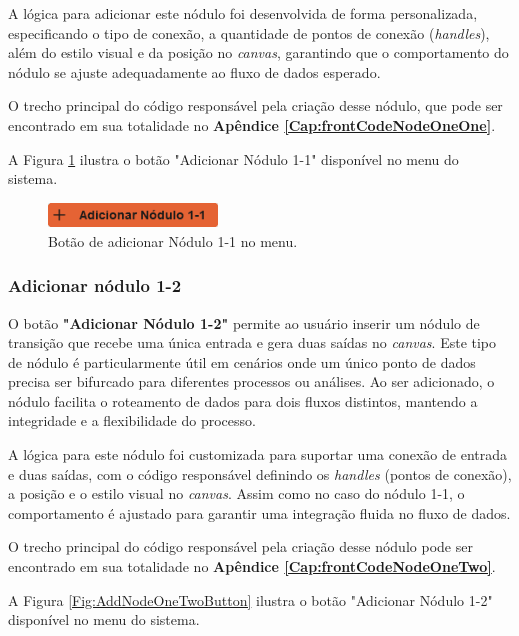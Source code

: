 A lógica para adicionar este nódulo foi desenvolvida de forma personalizada, especificando o tipo de conexão, a quantidade de pontos de conexão (\textit{handles}), além do estilo visual e da posição no \textit{canvas}, garantindo que o comportamento do nódulo se ajuste adequadamente ao fluxo de dados esperado.

O trecho principal do código responsável pela criação desse nódulo, que pode ser encontrado em sua totalidade no \textbf{Apêndice \ref{Cap:frontCodeNodeOneOne}}.

A Figura \ref{Fig:AddNodeOneOneButton} ilustra o botão "Adicionar Nódulo 1-1" disponível no menu do sistema.

\begin{figure}[htbp]
    \centering
    \includegraphics[width=0.4\textwidth]{figuras/add-node11-button.png}
    \caption{Botão de adicionar Nódulo 1-1 no menu.}
    \label{Fig:AddNodeOneOneButton}
\end{figure}


\subsubsection{Adicionar nódulo 1-2}

O botão \textbf{"Adicionar Nódulo 1-2"} permite ao usuário inserir um nódulo de transição que recebe uma única entrada e gera duas saídas no \textit{canvas}. Este tipo de nódulo é particularmente útil em cenários onde um único ponto de dados precisa ser bifurcado para diferentes processos ou análises. Ao ser adicionado, o nódulo facilita o roteamento de dados para dois fluxos distintos, mantendo a integridade e a flexibilidade do processo.

A lógica para este nódulo foi customizada para suportar uma conexão de entrada e duas saídas, com o código responsável definindo os \textit{handles} (pontos de conexão), a posição e o estilo visual no \textit{canvas}. Assim como no caso do nódulo 1-1, o comportamento é ajustado para garantir uma integração fluida no fluxo de dados.

O trecho principal do código responsável pela criação desse nódulo pode ser encontrado em sua totalidade no \textbf{Apêndice \ref{Cap:frontCodeNodeOneTwo}}.

A Figura \ref{Fig:AddNodeOneTwoButton} ilustra o botão "Adicionar Nódulo 1-2" disponível no menu do sistema.

